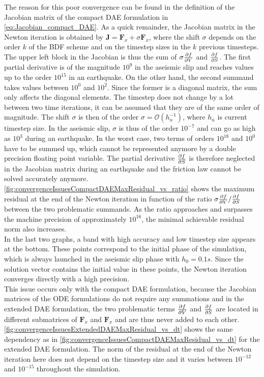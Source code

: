 The reason for this poor convergence can be found in the definition of the Jacobian matrix of the compact DAE formulation in \autoref{eq:Jacobian_compact_DAE}. As a quick remainder, the Jacobian matrix in the Newton iteration is obtained by $\mathbf{J} = \mathbf{F}_x + \sigma \mathbf{F}_{\dot{x}}$, where the shift $\sigma$ depends on the order $k$ of the BDF scheme and on the timestep sizes in the $k$ previous timesteps. The upper left block in the Jacobian is thus the sum of $\sigma\pdv{f}{V}$ and $\pdv{f}{S}$. The first partial derivative is of the magnitude $10^9$ in the aseismic slip and reaches values up to the order $10^{15}$ in an earthquake. On the other hand, the second summand takes values between $10^0$ and $10^2$. Since the former is a diagonal matrix, the sum only affects the diagonal elements. The timestep does not change by a lot between two time iterations, it can be assumed that they are of the same order of magnitude. The shift $\sigma$ is then of the order $\sigma = \mathcal{O}\left(h_n^{-1}\right)$, where $h_n$ is current timestep size. In the aseismic slip, $\sigma$ is thus of the order $10^{-7}$ and can go as high as $10^3$ during an earthquake. In the worst case, two terms of orders $10^{18}$ and $10^0$ have to be summed up, which cannot be represented anymore by a double precision floating point variable. The partial derivative $\pdv{f}{S}$ is therefore neglected in the Jacobian matrix during an earthquake and the friction law cannot be solved accurately anymore. \autoref{fig:convergenceIssuesCompactDAEMaxResidual_vs_ratio} shows the maximum residual at the end of the Newton iteration in function of the ratio $\sigma\pdv{f}{V} / \pdv{f}{S}$ between the two problematic summands. As the ratio approaches and surpasses the machine precision of approximately $10^{16}$, the minimal achievable residual norm also increases.\\
In the last two graphs, a band with high accuracy and low timestep size appears at the bottom. These points correspond to the initial phase of the simulation, which is always launched in the aseismic slip phase with $h_0=0.1s$. Since the solution vector contains the initial value in these points, the Newton iteration converges directly with a high precision. \\
This issue occurs only with the compact DAE formulation, because the Jacobian matrices of the ODE formulations do not require any summations and in the extended DAE formulation, the two problematic terms $\pdv{f}{V}$ and $\pdv{f}{S}$ are located in different submatrices of $\mathbf{F}_{\dot{x}}$ and $\mathbf{F}_x$ and are thus never added to each other. \autoref{fig:convergenceIssuesExtendedDAEMaxResidual_vs_dt} shows the same dependency as in \autoref{fig:convergenceIssuesCompactDAEMaxResidual_vs_dt} for the extended DAE formulation. The norm of the residual at the end of the Newton iteration here does not depend on the timestep size and it varies between $10^{-12}$ and $10^{-15}$ throughout the simulation. 

